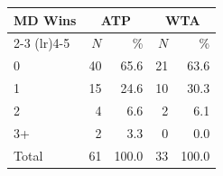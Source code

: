 \begin{tabular}{l rr rr}
\toprule
MD Wins & \multicolumn{2}{c}{ATP} & \multicolumn{2}{c}{WTA} \\
\cmidrule(lr){2-3}
\cmidrule(lr){4-5}
 & $N$ & \% & $N$ & \% \\
\midrule
0 & 40 & 65.6 & 21 & 63.6 \\
1 & 15 & 24.6 & 10 & 30.3 \\
2 & 4 & 6.6 & 2 & 6.1 \\
3+ & 2 & 3.3 & 0 & 0.0 \\
\midrule
Total & 61 & 100.0 & 33 & 100.0 \\
\bottomrule
\end{tabular}
